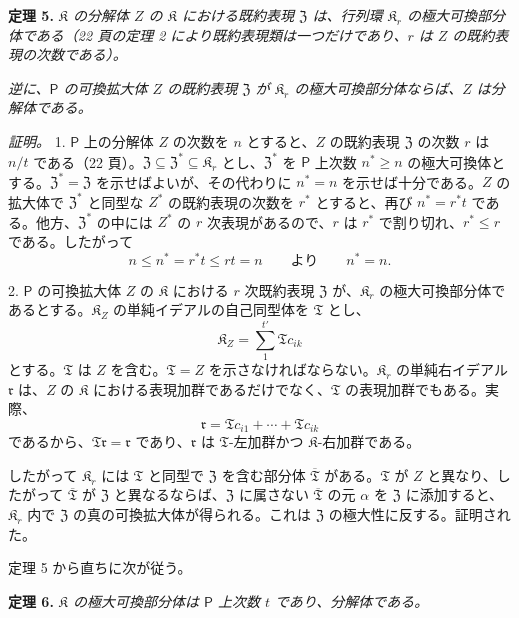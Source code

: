 \textbf{定理 5.} \emph{$\mathfrak K$ の分解体 $Z$ の $\mathfrak K$ における既約表現 $\mathfrak Z$ は、行列環 $\mathfrak K_r$ の極大可換部分体である（22 頁の定理 2 により既約表現類は一つだけであり、$r$ は $Z$ の既約表現の次数である）。}

\emph{逆に、$\mathsf P$ の可換拡大体 $Z$ の既約表現 $\mathfrak Z$ が $\mathfrak K_r$ の極大可換部分体ならば、$Z$ は分解体である。}

\emph{証明。} 1. $\mathsf P$ 上の分解体 $Z$ の次数を $n$ とすると、$Z$ の既約表現 $\mathfrak Z$ の次数 $r$ は $n/t$ である（22 頁）。$\mathfrak Z\subseteq\mathfrak Z^*\subseteq\mathfrak K_r$ とし、$\mathfrak Z^*$ を $\mathsf P$ 上次数 $n^*\geq n$ の極大可換体とする。$\mathfrak Z^*=\mathfrak Z$ を示せばよいが、その代わりに $n^*=n$ を示せば十分である。$Z$ の拡大体で $\mathfrak Z^*$ と同型な $Z^*$ の既約表現の次数を $r^*$ とすると、再び $n^*=r^*t$ である。他方、$\mathfrak Z^*$ の中には $Z^*$ の $r$ 次表現があるので、$r$ は $r^*$ で割り切れ、$r^*\leq r$ である。したがって
\[
n\leq n^*=r^*t\leq rt=n \qquad\text{より}\qquad n^*=n.
\]

2. $\mathsf P$ の可換拡大体 $Z$ の $\mathfrak K$ における $r$ 次既約表現 $\mathfrak Z$ が、$\mathfrak K_r$ の極大可換部分体であるとする。$\mathfrak K_Z$ の単純イデアルの自己同型体を $\mathfrak T$ とし、
\[
\mathfrak K_Z=\sum_{1}^{t'}\mathfrak T c_{ik}
\]
とする。$\mathfrak T$ は $Z$ を含む。$\mathfrak T=Z$ を示さなければならない。$\mathfrak K_r$ の単純右イデアル $\mathfrak r$ は、$Z$ の $\mathfrak K$ における表現加群であるだけでなく、$\mathfrak T$ の表現加群でもある。実際、
\[
\mathfrak r=\mathfrak T c_{i1}+\cdots+\mathfrak T c_{ik}
\]
であるから、$\mathfrak T\mathfrak r=\mathfrak r$ であり、$\mathfrak r$ は $\mathfrak T$-左加群かつ $\mathfrak K$-右加群である。

したがって $\mathfrak K_r$ には $\mathfrak T$ と同型で $\mathfrak Z$ を含む部分体 $\overline{\mathfrak T}$ がある。$\mathfrak T$ が $Z$ と異なり、したがって $\overline{\mathfrak T}$ が $\mathfrak Z$ と異なるならば、$\mathfrak Z$ に属さない $\overline{\mathfrak T}$ の元 $\alpha$ を $\mathfrak Z$ に添加すると、$\mathfrak K_r$ 内で $\mathfrak Z$ の真の可換拡大体が得られる。これは $\mathfrak Z$ の極大性に反する。証明された。

定理 5 から直ちに次が従う。

\textbf{定理 6.} \emph{$\mathfrak K$ の極大可換部分体は $\mathsf P$ 上次数 $t$ であり、分解体である。}

